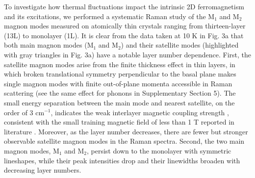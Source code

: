 \documentclass[prl, preprint, superscriptaddress]{revtex4-1}
\begin{document}
To investigate how thermal fluctuations impact the intrinsic 2D ferromagnetism and its excitations, we performed a systematic Raman study of the $\mathrm{M_1}$ and $\mathrm{M_2}$ magnon modes measured on atomically thin  crystals ranging from thirteen-layer (13L) to monolayer (1L). It is clear from the data taken at 10 K in Fig. 3a that both main magnon modes ($\mathrm{M_1}$ and $\mathrm{M_2}$) and their satellite modes (highlighted with gray triangles in Fig. 3a) have a notable layer number dependence. First, the satellite magnon modes arise from the finite thickness effect in thin layers, in which broken translational symmetry perpendicular to the basal plane makes single magnon modes with finite out-of-plane momenta accessible in Raman scattering \cite{Nemanich1979, Saito1999} (see the same effect for phonons in Supplementary Section 5). The small energy separation between the main mode and nearest satellite, on the order of 3 $\mathrm{cm}^{-1}$, indicates the weak interlayer magnetic coupling strength \cite{Pershoguba2018}, consistent with the small training magnetic field of less than 1 T reported in literature \cite{Huang2017, Song2018, Klein2018}. Moreover, as the layer number decreases, there are fewer but stronger observable satellite magnon modes in the Raman spectra. Second, the two main magnon modes, $\mathrm{M_1}$ and $\mathrm{M_2}$, persist down to the monolayer with symmetric lineshapes, while their peak intensities drop and their linewidths broaden with decreasing layer numbers.
\end{document}
